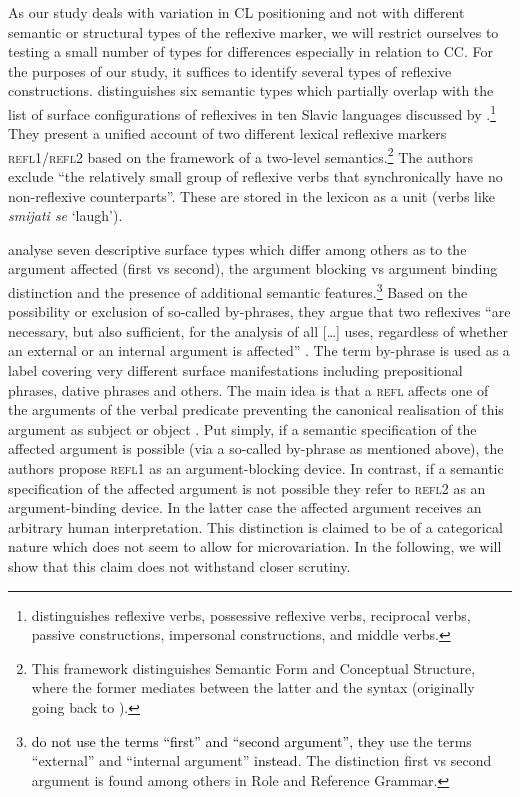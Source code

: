 As our study deals with variation in CL positioning and not with different semantic or structural types of the reflexive marker, we will restrict ourselves to testing a small number of types for differences especially in relation to CC. For the purposes of our study, it suffices to identify several types of reflexive constructions. \citet{Moulton15} distinguishes six semantic types which partially overlap with the list of surface configurations of reflexives in ten Slavic languages discussed by \citet{FJL10}.\footnote{\citet{Moulton15} distinguishes reflexive verbs, possessive reflexive verbs, reciprocal verbs, passive constructions, impersonal constructions, and middle verbs.} They present a unified account of two different lexical reflexive markers \textsc{refl1/refl2} based on the framework of a two-level semantics.\footnote{This framework distinguishes Semantic Form and Conceptual Structure, where the former mediates between the latter and the syntax (originally going back to \citealt{Bierwisch86}).} The authors exclude ``the relatively small group of reflexive verbs that synchronically have no non-reflexive counterparts''. These are stored in the lexicon as a unit (verbs like \textit{smijati se} `laugh'). 

\citet{FJL10} analyse seven descriptive surface types which differ among others as to the argument affected (first vs second), the argument blocking vs argument binding distinction and the presence of additional semantic features.\footnote{\textcolor{black}{\citet{FJL10} do not use the terms ``first'' and ``second argument'', they} use the terms ``external'' and ``internal argument'' \textcolor{black}{instead}. The distinction first vs second argument is found among others in Role and Reference Grammar.} Based on the possibility or exclusion of so-called by-phrases, they argue that two reflexives ``are necessary, but also sufficient, for the analysis of all [\dots] uses, regardless of whether an external or an internal argument is affected'' \citep[206]{FJL10}. The term by-phrase is used as a label covering very different surface manifestations including prepositional phrases, dative phrases and others. The main idea is that a \textsc{refl} affects one of the arguments of the verbal predicate preventing the canonical realisation of this argument as subject or object \citep[208]{FJL10}. Put simply, if a semantic specification of the affected argument is possible (via a so-called by-phrase as mentioned above), the authors propose \textsc{refl1} as an argument-blocking device. In contrast, if a semantic specification of the affected argument is not possible they refer to \textsc{refl2} as an argument-binding device. In the latter case the affected argument receives an arbitrary human interpretation. This distinction is claimed to be of a categorical nature which does not seem to allow for microvariation. In the following, we will show that this claim does not withstand closer scrutiny. 

